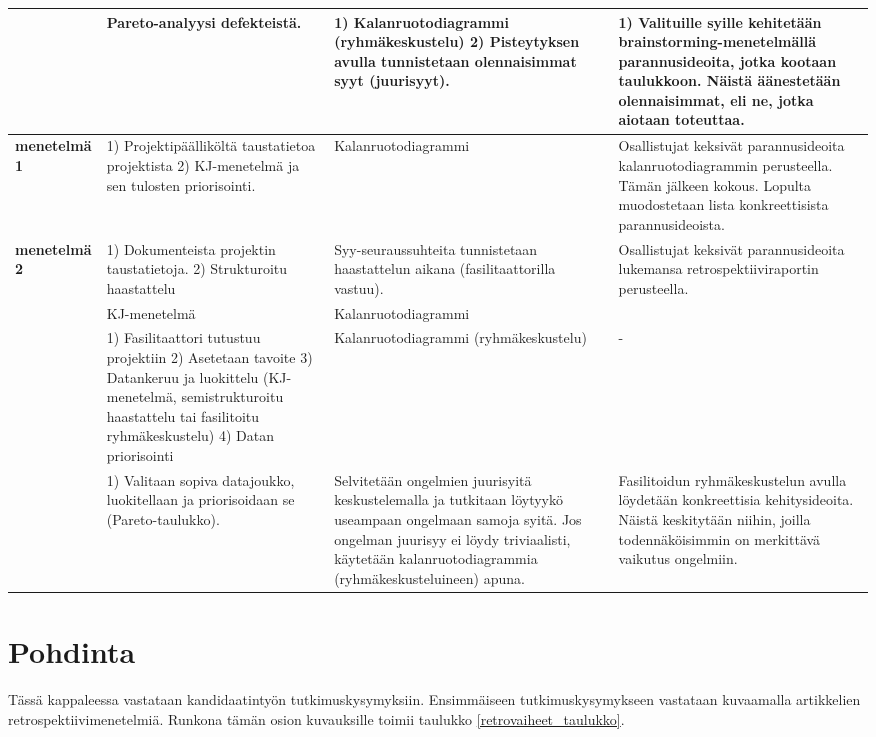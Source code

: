 \begin{center}
\begin{longtable}{|p{3cm}|p{4cm}|p{4cm}|p{4cm}|}
	\textbf{\citep{staalhane2004root}} & Pareto-analyysi defekteistä. & 1) Kalanruotodiagrammi (ryhmäkeskustelu) 2) Pisteytyksen avulla tunnistetaan olennaisimmat syyt (juurisyyt). & 1) Valituille syille kehitetään brainstorming-menetelmällä parannusideoita, jotka kootaan taulukkoon. Näistä äänestetään olennaisimmat, eli ne, jotka aiotaan toteuttaa. \\ \hline
	\textbf{\citep{staalhane2003post} menetelmä 1} & 1) Projektipäälliköltä taustatietoa projektista 2) KJ-menetelmä ja sen tulosten priorisointi. & Kalanruotodiagrammi & Osallistujat keksivät parannusideoita kalanruotodiagrammin perusteella. Tämän jälkeen kokous. Lopulta muodostetaan lista konkreettisista parannusideoista. \\ \hline
	\textbf{\citep{staalhane2003post} menetelmä 2} & 1) Dokumenteista projektin taustatietoja. 2) Strukturoitu haastattelu & Syy-seuraussuhteita tunnistetaan haastattelun aikana (fasilitaattorilla vastuu). & Osallistujat keksivät parannusideoita lukemansa retrospektiiviraportin perusteella. \\ \hline
	\textbf{\citep{dingsoyr2003extending}} & KJ-menetelmä & Kalanruotodiagrammi &  \\ \hline
	\textbf{\citep{birk2002postmortem}} & 1) Fasilitaattori tutustuu projektiin 2) Asetetaan tavoite 3) Datankeruu ja luokittelu (KJ-menetelmä,  semistrukturoitu haastattelu tai fasilitoitu ryhmäkeskustelu) 4) Datan priorisointi & Kalanruotodiagrammi (ryhmäkeskustelu) & - \\ \hline
	\textbf{\citep{card1998learning}} & 1) Valitaan sopiva datajoukko, luokitellaan ja priorisoidaan se (Pareto-taulukko). & Selvitetään ongelmien juurisyitä keskustelemalla ja tutkitaan löytyykö useampaan ongelmaan samoja syitä. Jos ongelman juurisyy ei löydy triviaalisti, käytetään kalanruotodiagrammia (ryhmäkeskusteluineen) apuna. & Fasilitoidun ryhmäkeskustelun avulla löydetään konkreettisia kehitysideoita. Näistä keskitytään niihin, joilla todennäköisimmin on merkittävä vaikutus ongelmiin. \\ \hline
\end{longtable}
\end{center}

\section{Pohdinta}
Tässä kappaleessa vastataan kandidaatintyön tutkimuskysymyksiin. Ensimmäiseen tutkimuskysymykseen vastataan kuvaamalla artikkelien retrospektiivimenetelmiä. Runkona tämän osion kuvauksille toimii taulukko \ref{retrovaiheet_taulukko}.

